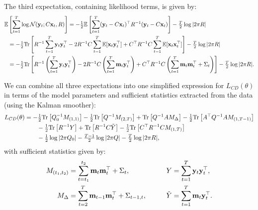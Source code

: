\documentclass[10pt]{article}
\newcommand{\vx}{\mathbf{x}}
\newcommand{\vy}{\mathbf{y}}
\newcommand{\vm}{\mathbf{m}}
\begin{document}
The third expectation, containing likelihood terms, is given by:
\begin{align}
  \E &\left[\sum_{t=1}^T \log \Nrm(\vy_t ;
                  C\vx_t,R) \right] 
  =  - \tonehlf \E\left[\sum_{t=1}^T (\vy_t - C \vx_t)\trp R\inv (\vy_t - C\vx_t)
    \right]   -\tfrac{T}{2} \log |2\pi R| \nonumber \\
  &= 
  - \tonehlf \Tr\left[R\inv \sum_{t=1}^{T} \vy_t \vy_{t}\trp  
                  -2 R\inv C \sum_{t=1}^{T} \E[\vx_t
    \vy_{t}\trp]  
    + C\trp R\inv C \sum_{t=1}^{T} \E[ \vx_t \vx_t\trp]
                  \right]  -\tfrac{T}{2} \log |2\pi R|
    \nonumber \\
  &= 
  - \tonehlf \Tr\left[R\inv \left(\sum_{t=1}^{T} \vy_t \vy_{t}\trp \right) 
                  -2 R\inv C \left(\sum_{t=1}^{T} \vm_t
    \vy_{t}\trp \right) 
                     + C\trp R\inv C \left(\sum_{t=1}^{T}
                  \vm_t \vm_{t}\trp + \Sigma_{t}\right) \right]
    -\tfrac{T}{2} \log |2\pi R|.
\end{align}

We can combine all three expectations into one simplified expression
for $L_{CD}(\theta)$ in terms of the model parameters and sufficient
statistics extracted from the data (using the Kalman smoother):
\begin{align}
  L_{CD}(\theta) & = 
                  - \tfrac{1}{2} \mathrm{Tr}\left[Q_0^{-1} M_{(1,1)}  \right]
                  - \tfrac{1}{2} \mathrm{Tr}\left[Q^{-1} M_{(2,T)}  \right]
                  + \mathrm{Tr}\left[Q^{-1} A M_\Delta \right]
                  - \tfrac{1}{2} \mathrm{Tr}\left[ A^\top Q^{-1} A M_{(1,T-1)}
                   \right]
                  \nonumber \\
   & \qquad 
                  - \tfrac{1}{2} \mathrm{Tr}\left[R^{-1} Y  \right]
                  + \mathrm{Tr}\left[R^{-1} C \tilde Y \right]
     - \tfrac{1}{2} \mathrm{Tr}\left[ C^\top R^{-1} C M_{(1,T)}  \right]
      \nonumber \\
                 & \qquad
                   -\tfrac{1}{2}\log |2\pi Q_0|
                   -\tfrac{T-1}{2} \log |2\pi Q|
                   -\tfrac{T}{2} \log |2\pi R|,
                   \label{eq:cdllnoinput}
\end{align}
with sufficient statistics given by:
\begin{alignat}{4}
  \label{eq:suffstats1}
  M_{(t_1,t_2)} &= \sum_{t=t_1}^{t_2} \vm_t \vm_{t}\trp + \Sigma_{t}, 
  \qquad && 
   Y  = \sum_{t=1}^{T} \vy_t \vy_{t}\trp, \\
   M_\Delta  &= \sum_{t=2}^{T} \vm_{t-1} \vm_{t}\trp + \Sigma_{t-1,t}, 
   \qquad &&
   \tilde  Y  = \sum_{t=1}^{T} \vm_{t}\vy_t\trp.
     \label{eq:suffstats2}
\end{alignat}
\end{document}
